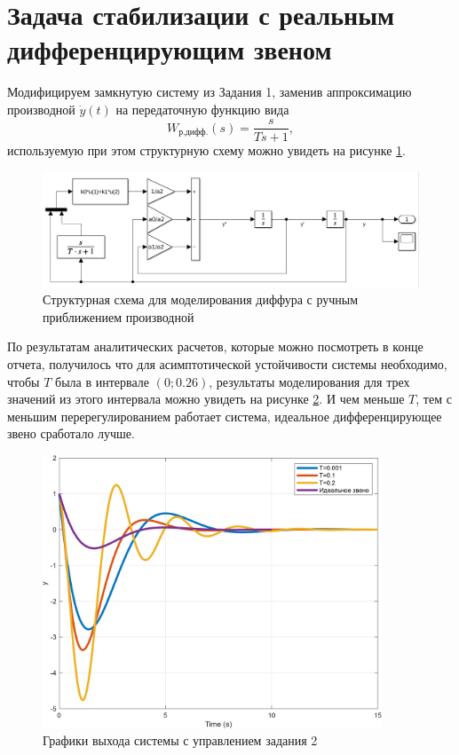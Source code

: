 \section{Задача стабилизации с реальным дифференцирующим звеном}

Модифицируем замкнутую систему из Задания 1, заменив аппроксимацию производной $\dot y(t)$
на передаточную функцию вида
\begin{equation*}
    W_{\text{р.дифф.}}(s)=\frac{s}{Ts+1},
\end{equation*}
используемую при этом структурную схему можно увидеть на рисунке \ref{fig:task_2_xls}.
\begin{figure}[H]
    \centering
    \includegraphics[width=1\textwidth]{figs/task_2_slx.png}
    \caption{Структурная схема для моделирования диффура с ручным приближением производной}
    \label{fig:task_2_xls}
\end{figure}
По результатам аналитических расчетов, которые можно посмотреть в конце
отчета, получилось что для асимптотической устойчивости
системы необходимо, чтобы $T$ была в интервале $(0;0.26)$, результаты 
моделирования для трех значений из этого интервала можно увидеть
на рисунке \ref{fig:task_2_out}. И чем меньше $T$, тем с меньшим
перерегулированием работает система, идеальное дифференцирующее звено сработало лучше.
\begin{figure}[H]
    \centering
    \includegraphics[width=0.9\textwidth]{figs/task_2_out.png}
    \caption{Графики выхода системы с управлением задания 2}
    \label{fig:task_2_out}
\end{figure}




